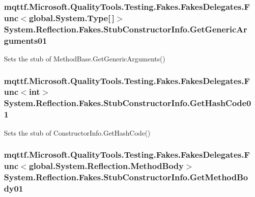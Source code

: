 \hypertarget{class_system_1_1_reflection_1_1_fakes_1_1_stub_constructor_info_ad3ecbe65df41861843f8c5188be5f3a6}{
\subsubsection[{Get\-Generic\-Arguments01}]{\setlength{\rightskip}{0pt plus 5cm}mqttf.\-Microsoft.\-Quality\-Tools.\-Testing.\-Fakes.\-Fakes\-Delegates.\-Func$<$global.\-System.\-Type\mbox{[}$\,$\mbox{]}$>$ System.\-Reflection.\-Fakes.\-Stub\-Constructor\-Info.\-Get\-Generic\-Arguments01}}\label{class_system_1_1_reflection_1_1_fakes_1_1_stub_constructor_info_ad3ecbe65df41861843f8c5188be5f3a6}


Sets the stub of Method\-Base.\-Get\-Generic\-Arguments()

\hypertarget{class_system_1_1_reflection_1_1_fakes_1_1_stub_constructor_info_a60353a3ba2a8f58c61a1a50e7725cce9}{
\subsubsection[{Get\-Hash\-Code01}]{\setlength{\rightskip}{0pt plus 5cm}mqttf.\-Microsoft.\-Quality\-Tools.\-Testing.\-Fakes.\-Fakes\-Delegates.\-Func$<$int$>$ System.\-Reflection.\-Fakes.\-Stub\-Constructor\-Info.\-Get\-Hash\-Code01}}\label{class_system_1_1_reflection_1_1_fakes_1_1_stub_constructor_info_a60353a3ba2a8f58c61a1a50e7725cce9}


Sets the stub of Constructor\-Info.\-Get\-Hash\-Code()

\hypertarget{class_system_1_1_reflection_1_1_fakes_1_1_stub_constructor_info_ac0fe0f13a29190f4c1121f03c10bc650}{
\subsubsection[{Get\-Method\-Body01}]{\setlength{\rightskip}{0pt plus 5cm}mqttf.\-Microsoft.\-Quality\-Tools.\-Testing.\-Fakes.\-Fakes\-Delegates.\-Func$<$global.\-System.\-Reflection.\-Method\-Body$>$ System.\-Reflection.\-Fakes.\-Stub\-Constructor\-Info.\-Get\-Method\-Body01}}\label{class_system_1_1_reflection_1_1_fakes_1_1_stub_constructor_info_ac0fe0f13a29190f4c1121f03c10bc650}


